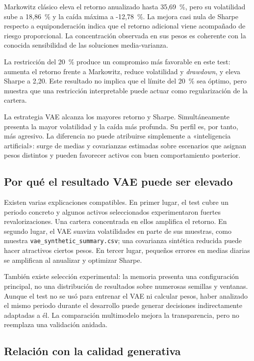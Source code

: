 Markowitz clásico eleva el retorno anualizado hasta 35,69~\%, pero su volatilidad sube a 18,86~\% y la caída máxima a -12,78~\%. La mejora casi nula de Sharpe respecto a equiponderación indica que el retorno adicional viene acompañado de riesgo proporcional. La concentración observada en sus pesos es coherente con la conocida sensibilidad de las soluciones media-varianza.

La restricción del 20~\% produce un compromiso más favorable en este test: aumenta el retorno frente a Markowitz, reduce volatilidad y \textit{drawdown}, y eleva Sharpe a 2,20. Este resultado no implica que el límite del 20~\% sea óptimo, pero muestra que una restricción interpretable puede actuar como regularización de la cartera.

La estrategia VAE alcanza los mayores retorno y Sharpe. Simultáneamente presenta la mayor volatilidad y la caída más profunda. Su perfil es, por tanto, más agresivo. La diferencia no puede atribuirse simplemente a «inteligencia artificial»: surge de medias y covarianzas estimadas sobre escenarios que asignan pesos distintos y pueden favorecer activos con buen comportamiento posterior.

\subsection{Por qué el resultado VAE puede ser elevado}

Existen varias explicaciones compatibles. En primer lugar, el test cubre un periodo concreto y algunos activos seleccionados experimentaron fuertes revalorizaciones. Una cartera concentrada en ellos amplifica el retorno. En segundo lugar, el VAE suaviza volatilidades en parte de sus muestras, como muestra \texttt{vae\_synthetic\_summary.csv}; una covarianza sintética reducida puede hacer atractivos ciertos pesos. En tercer lugar, pequeños errores en medias diarias se amplifican al anualizar y optimizar Sharpe.

También existe selección experimental: la memoria presenta una configuración principal, no una distribución de resultados sobre numerosas semillas y ventanas. Aunque el test no se usó para entrenar el VAE ni calcular pesos, haber analizado el mismo periodo durante el desarrollo puede generar decisiones indirectamente adaptadas a él. La comparación multimodelo mejora la transparencia, pero no reemplaza una validación anidada.

\subsection{Relación con la calidad generativa}

